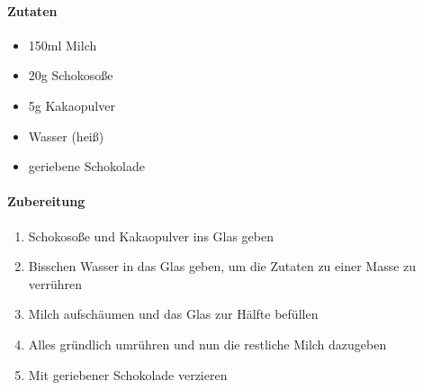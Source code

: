 \clearpage
{}

\paragraph{Zutaten}
\begin{itemize}[noitemsep]
	\item 150ml Milch
	\item 20g Schokosoße
	\item 5g Kakaopulver
	\item Wasser (heiß)
	\item geriebene Schokolade
\end{itemize}

\paragraph{Zubereitung}
\begin{enumerate}[noitemsep]
	\item Schokosoße und Kakaopulver ins Glas geben
	\item Bisschen Wasser in das Glas geben, um die Zutaten zu einer Masse zu verrühren
	\item Milch aufschäumen und das Glas zur Hälfte befüllen
	\item Alles gründlich umrühren und nun die restliche Milch dazugeben
	\item Mit geriebener Schokolade verzieren
\end{enumerate}